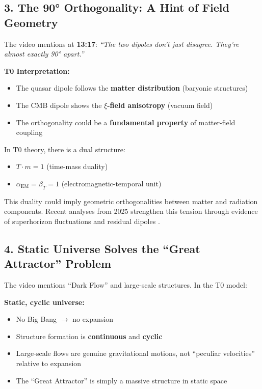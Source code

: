 \documentclass{article}
\begin{document}
	\subsection{3. The 90° Orthogonality: A Hint of Field Geometry}
	
	The video mentions at \textbf{13:17}: \textit{``The two dipoles don't just disagree. They're almost exactly 90° apart.''} \cite{secrest2024}
	
	\textbf{T0 Interpretation:}
	\begin{itemize}
		\item The quasar dipole follows the \textbf{matter distribution} (baryonic structures)
		\item The CMB dipole shows the \textbf{$\xi$-field anisotropy} (vacuum field)
		\item The orthogonality could be a \textbf{fundamental property} of matter-field coupling
	\end{itemize}
	
	In T0 theory, there is a dual structure:
	\begin{itemize}
		\item $T \cdot m = 1$ (time-mass duality)
		\item $\alpha_{\text{EM}} = \beta_T = 1$ (electromagnetic-temporal unit)
	\end{itemize}
	
	This duality could imply geometric orthogonalities between matter and radiation components. Recent analyses from 2025 strengthen this tension through evidence of superhorizon fluctuations and residual dipoles \cite{sarkar2025, bengaly2025}.
	
	\subsection{4. Static Universe Solves the ``Great Attractor'' Problem}
	
	The video mentions ``Dark Flow'' and large-scale structures. In the T0 model:
	
	\textbf{Static, cyclic universe:}
	\begin{itemize}
		\item No Big Bang $\rightarrow$ no expansion
		\item Structure formation is \textbf{continuous} and \textbf{cyclic}
		\item Large-scale flows are genuine gravitational motions, not ``peculiar velocities'' relative to expansion
		\item The ``Great Attractor'' is simply a massive structure in static space
	\end{itemize}
	
\end{document}
